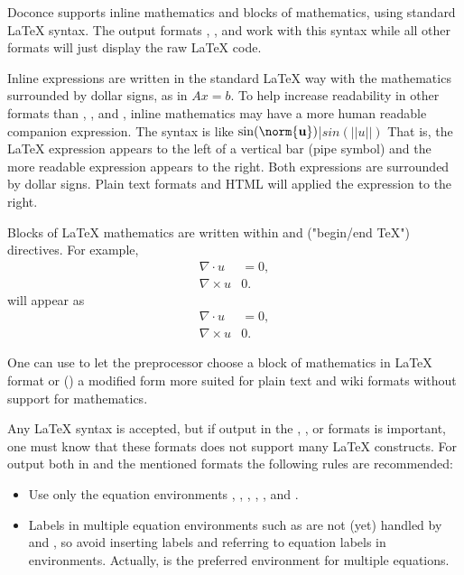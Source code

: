 \documentclass[twoside]{book}
\begin{document}
{Doconce supports inline mathematics and blocks of mathematics, using
standard {\LaTeX} syntax. The output formats , , and 
work with this syntax while all other formats will just display the
raw {\LaTeX} code.

Inline expressions are written in the standard
{\LaTeX} way with the mathematics surrounded by dollar signs, as in
$Ax=b$. To help increase readability in other formats than ,
, and , inline mathematics may have a more human
readable companion expression. The syntax is like
\bccq
$\sin(\norm{\bf u})$|$sin(||u||)$
\eccq
That is, the {\LaTeX} expression appears to the left of a vertical bar (pipe
symbol) and the more readable expression appears to the right. Both
expressions are surrounded by dollar signs. Plain text formats and HTML
will applied the expression to the right.

Blocks of {\LaTeX} mathematics are written within
and
 ("begin/end TeX") directives.
For example,
\bccq
\begin{align*}
\nabla\cdot u &= 0,\\
\nabla\times u & 0.
\end{align*}
\eccq
will appear as
\begin{align*}
\nabla\cdot u &= 0,\\
\nabla\times u & 0.
\end{align*}

One can use  to let
the preprocessor choose a block of mathematics in {\LaTeX} format
or () a modified form more suited for plain text and wiki
formats without support for mathematics.

Any {\LaTeX} syntax is accepted, but if output in the , ,
or  formats
is important, one must know that these formats does not support many
{\LaTeX} constructs. For output both in  and the mentioned formats
the following rules are recommended:

\begin{itemize}
  \item Use only the equation environments \code{\[}, \code{\]},
    , , , and .

  \item Labels in multiple equation environments such as  are
    not (yet) handled by  and , so avoid inserting
    labels and referring  to equation labels in  environments.
    Actually,  is the preferred environment for multiple equations.


\end{itemize}}
\end{document}

